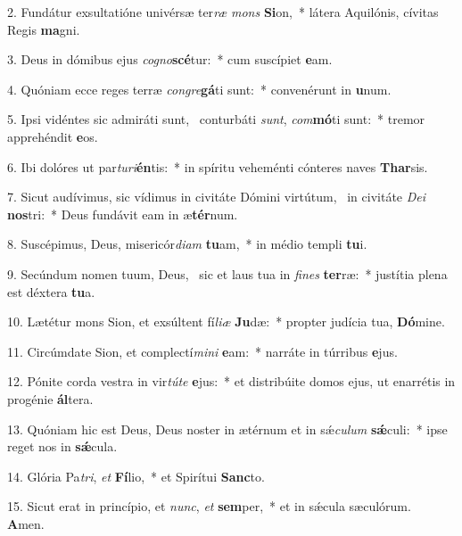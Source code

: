 2. Fundátur exsultatióne univérsæ ter\textit{ræ} \textit{mons} \textbf{Si}on,~*  látera Aquilónis, cívitas Regis \textbf{ma}gni.\

3. Deus in dómibus ejus \textit{co}\textit{gno}\textbf{scé}tur:~*  cum suscípiet \textbf{e}am.\

4. Quóniam ecce reges terræ \textit{con}\textit{gre}\textbf{gá}ti sunt:~*  convenérunt in \textbf{u}num.\

5. Ipsi vidéntes sic admiráti sunt, \dag\  conturbáti \textit{sunt}, \textit{com}\textbf{mó}ti sunt:~*  tremor apprehéndit \textbf{e}os.\

6. Ibi dolóres ut par\textit{tu}\textit{ri}\textbf{én}tis:~*  in spíritu veheménti cónteres naves \textbf{Thar}sis.\

7. Sicut audívimus, sic vídimus in civitáte Dómini virtútum, \dag\  in civitáte \textit{De}\textit{i} \textbf{nos}tri:~*  Deus fundávit eam in æ\textbf{tér}num.\

8. Suscépimus, Deus, misericór\textit{di}\textit{am} \textbf{tu}am,~*  in médio templi \textbf{tu}i.\

9. Secúndum nomen tuum, Deus, \dag\  sic et laus tua in \textit{fi}\textit{nes} \textbf{ter}ræ:~*  justítia plena est déxtera \textbf{tu}a.\

10. Lætétur mons Sion, et exsúltent fí\textit{li}\textit{æ} \textbf{Ju}dæ:~*  propter judícia tua, \textbf{Dó}mine.\

11. Circúmdate Sion, et complectí\textit{mi}\textit{ni} \textbf{e}am:~*  narráte in túrribus \textbf{e}jus.\

12. Pónite corda vestra in vir\textit{tú}\textit{te} \textbf{e}jus:~*  et distribúite domos ejus, ut enarrétis in progénie \textbf{ál}tera.\

13. Quóniam hic est Deus, Deus noster in ætérnum et in sǽ\textit{cu}\textit{lum} \textbf{sǽ}culi:~*  ipse reget nos in \textbf{sǽ}cula.\

14. Glória Pa\textit{tri}, \textit{et} \textbf{Fí}lio,~*  et Spirítui \textbf{Sanc}to.\

15. Sicut erat in princípio, et \textit{nunc}, \textit{et} \textbf{sem}per,~*  et in sǽcula sæculórum. \textbf{A}men.\

